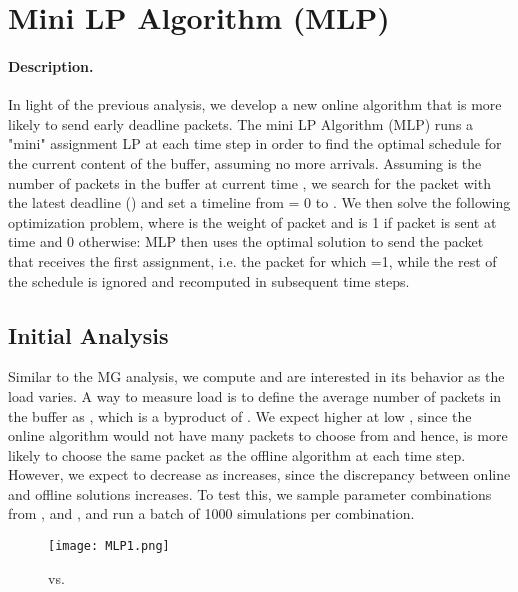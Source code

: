 \documentclass[oribibl]{llncs}
\begin{document}
\section {Mini LP Algorithm (MLP)}
\label{sec:MLP}
\paragraph{Description.} In light of the previous analysis, we 
develop a new online algorithm that is more likely to send early
deadline packets.  The mini LP Algorithm (MLP) runs a "mini"
assignment LP at each time step in order to find the optimal schedule
for the current content of the buffer, assuming no more
arrivals. Assuming  is the number of packets in the buffer at current time , we search for the packet with the latest deadline () and set a timeline from = 0 to . We then solve the following optimization problem, where  is the weight of packet  and  is 1 if packet  is sent at time  and 0 otherwise:
{\small }
MLP then uses the optimal solution to send the packet that receives the first assignment, i.e. the packet  for which =1, while
the rest of the schedule is ignored and recomputed in subsequent time
steps.



\subsection{Initial Analysis}
\label{subsec:MLP}


Similar to the MG analysis, we compute  and are interested
in its behavior as the load varies. A way to measure load is to define the average number of packets in the buffer as
, which is a byproduct of . We expect higher
 at low , since the online algorithm would not have
many packets to choose from and hence, is more likely to
choose the same packet as the offline algorithm at each time
step. However, we expect  to decrease as  increases, since the discrepancy between online
and offline solutions increases. To test this, we sample parameter combinations from ,  and ,  and run a batch of 1000 simulations per
combination. 

\begin{wrapfigure}[13]{r}{0.48\linewidth}
\vspace{-10pt}
\texttt{[image: MLP1.png]}
\caption{ vs. }
\label{fig:MLP1}
\end{wrapfigure}
\end{document}
